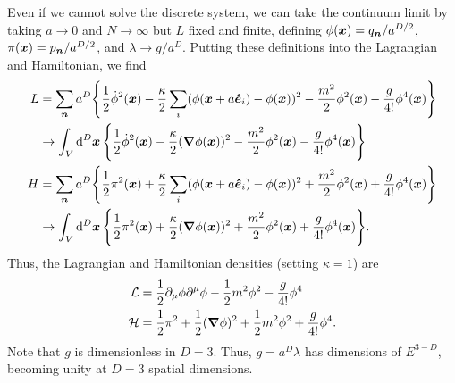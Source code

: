 {Even if we cannot solve the discrete system, we can take the continuum limit by taking $a \rightarrow 0$ and $N \rightarrow \infty$ but $L$ fixed and finite, defining $\phi(\vb*{x}) = q_{\vb*{n}}/a^{D/2}$, $\pi(\vb*{x}) = p_{\vb*{n}} / a^{D/2}$, and $\lambda \rightarrow g/a^{D}$.
Putting these definitions into the Lagrangian and Hamiltonian, we find
\begin{align}
    L &= \sum_{\vb*{n}} a^{D} \Bigg\{ \frac{1}{2} \dot{\phi}^2(\vb*{x}) - \frac{\kappa}{2} \sum_{i} (\phi(\vb*{x} + a \vu*{e}_{i}) - \phi(\vb*{x}))^2 - \frac{m^2}{2} \phi^2(\vb*{x}) - \frac{g}{4!} \phi^{4}(\vb*{x}) \Bigg\} \nonumber \\
      &\rightarrow \int_{V} \dd[D]{\vb*{x}} \Bigg\{ \frac{1}{2} \dot{\phi}^2(\vb*{x}) - \frac{\kappa}{2} (\grad \phi(\vb*{x}))^2 - \frac{m^2}{2} \phi^2(\vb*{x}) - \frac{g}{4!} \phi^{4}(\vb*{x}) \Bigg\} \\
    H &= \sum_{\vb*{n}} a^{D} \Bigg\{ \frac{1}{2} \pi^2(\vb*{x}) + \frac{\kappa}{2} \sum_{i} (\phi(\vb*{x} + a \vu*{e}_{i}) - \phi(\vb*{x}))^2 + \frac{m^2}{2} \phi^2(\vb*{x}) + \frac{g}{4!} \phi^{4}(\vb*{x}) \Bigg\} \nonumber \\
      &\rightarrow \int_{V} \dd[D]{\vb*{x}} \Bigg\{ \frac{1}{2} \pi^2(\vb*{x}) + \frac{\kappa}{2} (\grad \phi(\vb*{x}))^2 + \frac{m^2}{2} \phi^2(\vb*{x}) + \frac{g}{4!} \phi^{4}(\vb*{x}) \Bigg\}
.\end{align}
Thus, the Lagrangian and Hamiltonian densities (setting $\kappa = 1$) are
\begin{align}
    \mathcal{L} &= \frac{1}{2} \partial_{\mu} \phi \partial^{\mu} \phi - \frac{1}{2} m^2 \phi^2 - \frac{g}{4!} \phi^{4} \\
    \mathcal{H} &= \frac{1}{2} \pi^2 + \frac{1}{2} (\grad \phi)^2 + \frac{1}{2} m^2 \phi^2 + \frac{g}{4!} \phi^{4}
.\end{align}
Note that $g$ is dimensionless in $D = 3$.
Thus, $g = a^{D} \lambda$ has dimensions of $E^{3-D}$, becoming unity at $D = 3$ spatial dimensions.

}
